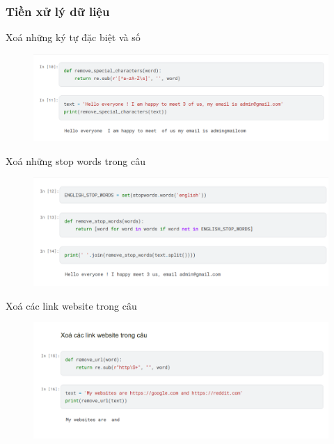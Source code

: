 \documentclass[serif, aspectratio=169]{beamer}
\begin{document}
	\subsubsection{Tiền xử lý dữ liệu}
	\begin{frame}{Xoá những ký tự đặc biệt và số}
		\begin{figure}
			\centering
			\includegraphics[width=1\linewidth]{pic/remove-special-char-num.png}
			\label{fig:remove-special-char-num}
		\end{figure}
	\end{frame}
	
	\begin{frame}{Xoá những stop words trong câu}
		\begin{figure}
			\centering
			\includegraphics[width=1\linewidth]{pic/remove-stopwords.png}
			\label{fig:remove-stopwords}
		\end{figure}
	\end{frame}
	
	\begin{frame}{Xoá các link website trong câu}
		\begin{figure}
			\centering
			\includegraphics[width=1\linewidth]{pic/remove-link.png}
			\label{fig:remove-link}
		\end{figure}
	\end{frame}
	
\end{document}
